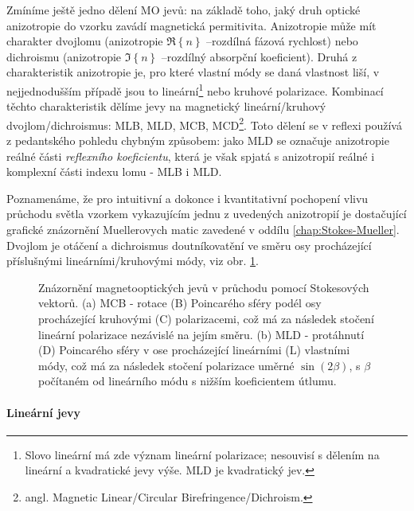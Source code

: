 Zmíníme ještě jedno dělení MO jevů: na základě toho, jaký druh optické anizotropie do vzorku zavádí magnetická permitivita.
Anizotropie může mít charakter dvojlomu (anizotropie $\Re\left\lbrace n\right\rbrace$ --\tododash rozdílná fázová rychlost) nebo dichroismu (anizotropie $\Im\left\lbrace n \right\rbrace$ --\tododash rozdílný absorpční koeficient).
Druhá z charakteristik anizotropie je, pro které vlastní módy se daná vlastnost liší, v nejjednodušším případě jsou to lineární\footnote{Slovo lineární má zde význam lineární polarizace; nesouvisí s dělením na lineární a kvadratické jevy výše. MLD je kvadratický jev.} nebo kruhové polarizace.
Kombinací těchto charakteristik dělíme jevy na magnetický lineární/kruhový dvojlom/dichroismus: MLB, MLD, MCB, MCD\footnote{angl. Magnetic Linear/Circular Birefringence/Dichroism.}.
Toto dělení se v reflexi používá z pedantského pohledu chybným způsobem: jako MLD se označuje anizotropie reálné části \emph{reflexního koeficientu}, která je však spjatá s anizotropií reálné i komplexní části indexu lomu - MLB i MLD. 

Poznamenáme, že pro intuitivní a dokonce i kvantitativní pochopení vlivu průchodu světla vzorkem vykazujícím jednu z uvedených anizotropií je dostačující grafické znázornění Muellerovych matic zavedené v oddílu \ref{chap:Stokes-Mueller}.
Dvojlom je otáčení a dichroismus doutníkovatění ve směru osy procházející příslušnými lineárními/kruhovými módy, viz obr. \ref{fig:deleni-M-LC-BD}.

\begin{figure}[htbp]
    \centering
    \caption{Znázornění magnetooptických jevů v průchodu pomocí Stokesových vektorů. (a) MCB - rotace (B) Poincarého sféry podél osy procházející kruhovými (C) polarizacemi, což má za následek stočení lineární polarizace nezávislé na jejím směru. (b) MLD - protáhnutí (D) Poincarého sféry v ose procházející lineárními (L) vlastními módy, což má za následek stočení polarizace uměrné $\sin(2\beta)$, s $\beta$ počítaném od lineárního módu s nižším koeficientem útlumu.}
    \label{fig:deleni-M-LC-BD}
\end{figure}

\paragraph{Lineární jevy}


